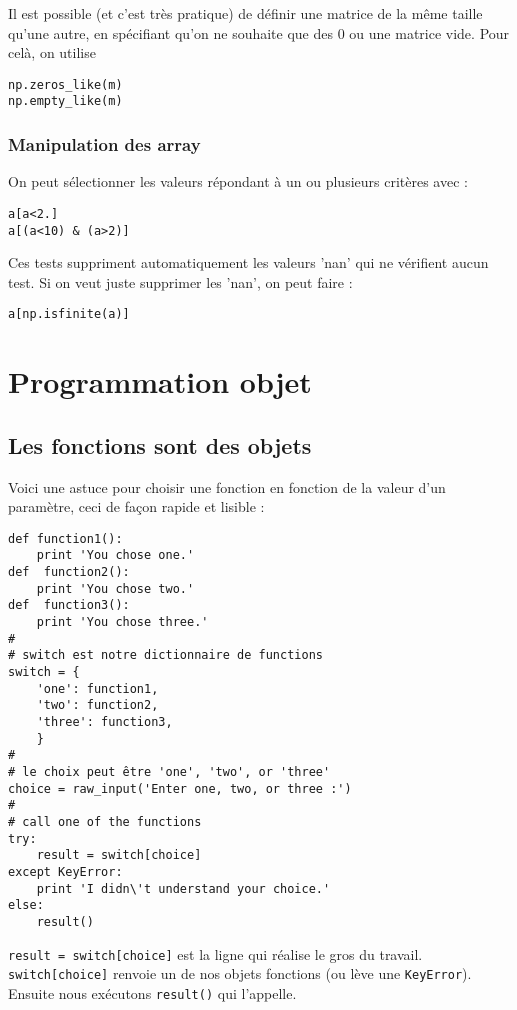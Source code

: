 \documentclass[a4paper,twoside]{article}
\begin{document}
Il est possible (et c'est très pratique) de définir une matrice de la même taille qu'une autre, en spécifiant qu'on ne souhaite que des 0 ou une matrice vide. Pour celà, on utilise
\begin{verbatim}
np.zeros_like(m)
np.empty_like(m)
\end{verbatim}

\subsubsection{Manipulation des array}
On peut sélectionner les valeurs répondant à un ou plusieurs critères avec :
\begin{verbatim}
a[a<2.]
a[(a<10) & (a>2)]
\end{verbatim}

Ces tests suppriment automatiquement les valeurs 'nan' qui ne vérifient aucun test. Si on veut juste supprimer les 'nan', on peut faire :
\begin{verbatim}
a[np.isfinite(a)]
\end{verbatim}



\section{Programmation objet}
\subsection{Les fonctions sont des objets}
Voici une astuce pour choisir une fonction en fonction de la valeur d'un paramètre, ceci de façon rapide et lisible :
\begin{verbatim}
def function1():
    print 'You chose one.'
def  function2():
    print 'You chose two.'
def  function3():
    print 'You chose three.'
#
# switch est notre dictionnaire de functions
switch = {
    'one': function1,
    'two': function2,
    'three': function3,
    }
#
# le choix peut être 'one', 'two', or 'three'
choice = raw_input('Enter one, two, or three :')
#
# call one of the functions
try:
    result = switch[choice]
except KeyError:
    print 'I didn\'t understand your choice.'
else:
    result()
\end{verbatim}

\verb|result = switch[choice]| est la ligne qui réalise le gros du travail. \verb|switch[choice]| renvoie un de nos objets fonctions (ou lève une \verb|KeyError|). Ensuite nous exécutons \verb|result()| qui l’appelle.
\end{document}
